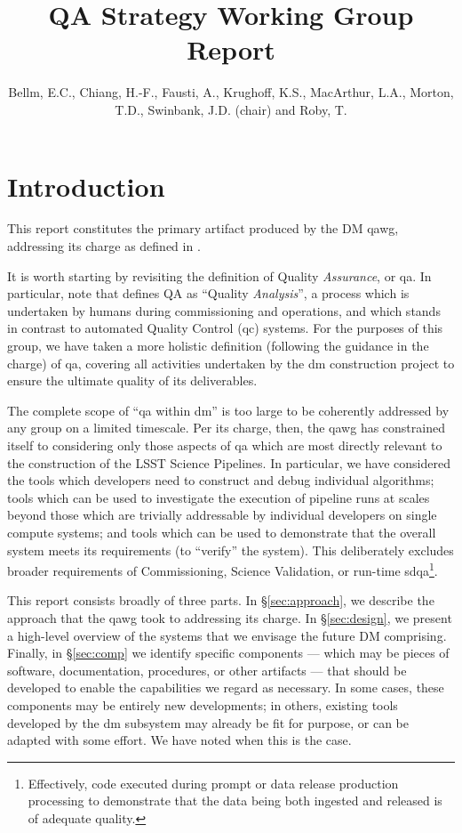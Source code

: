 \documentclass[DM,authoryear,toc]{lsstdoc}
\title{QA Strategy Working Group Report}
\author{%
Bellm, E.C.,
Chiang, H.-F.,
Fausti, A.,
Krughoff, K.S.,
MacArthur, L.A.,
Morton, T.D.,
Swinbank, J.D. (chair) and
Roby, T.
}
\date{\vcsDate}
\begin{document}
\maketitle

\section{Introduction}
\label{sec:intro}

This report constitutes the primary artifact produced by the DM \gls{qawg},
addressing its charge as defined in .

It is worth starting by revisiting the definition of Quality
\textit{Assurance}, or \gls{qa}.  In particular, note that 
defines QA as ``Quality \textit{Analysis}'', a process which is undertaken by
humans during commissioning and operations, and which stands in contrast to
automated Quality Control (\gls{qc}) systems. For the purposes of this group,
we have taken a more holistic definition (following the guidance in the
charge) of \gls{qa}, covering all activities undertaken by the \gls{dm}
construction project to ensure the ultimate quality of its deliverables.

The complete scope of ``\gls{qa} within \gls{dm}'' is too large to be
coherently addressed by any group on a limited timescale. Per its charge,
then, the \gls{qawg} has constrained itself to considering only those aspects
of \gls{qa} which are most directly relevant to the construction of the LSST
Science Pipelines. In particular, we have considered the tools which
developers need to construct and debug individual algorithms; tools which can
be used to investigate the execution of pipeline runs at scales beyond those
which are trivially addressable by individual developers on single compute
systems; and tools which can be used to demonstrate that the overall system
meets its requirements (to ``verify'' the system). This deliberately excludes
broader requirements of Commissioning, Science Validation, or run-time
\gls{sdqa}\footnote{Effectively, code executed during prompt or data release
production processing to demonstrate that the data being both ingested and
released is of adequate quality.}.

This report consists broadly of three parts. In \S\ref{sec:approach}, we
describe the approach that the \gls{qawg} took to addressing its charge. In
\S\ref{sec:design}, we present a high-level overview of the systems that we
envisage the future DM comprising. Finally, in \S\ref{sec:comp} we identify
specific components --- which may be pieces of software, documentation,
procedures, or other artifacts --- that should be developed to enable the
capabilities we regard as necessary. In some cases, these components may be
entirely new developments; in others, existing tools developed by the \gls{dm}
subsystem may already be fit for purpose, or can be adapted with some effort.
We have noted when this is the case.
\end{document}
